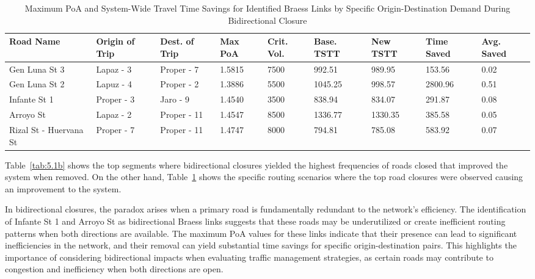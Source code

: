 {
\footnotesize 
\setlength{\tabcolsep}{1.5pt}  
\renewcommand{\thetable}{4.2b}
\begin{longtable}{|p{2.5cm}|p{1.5cm}|p{1.6cm}|p{1.2cm}|p{1.4cm}|p{1.4cm}|p{1.4cm}|p{1.3cm}|p{1.3cm}|} 

\hline
\textbf{Road Name} & \textbf{Origin of Trip} & \textbf{Dest. of Trip} & \textbf{Max PoA} & \textbf{Crit. Vol.} & \textbf{Base. TSTT} & \textbf{New TSTT} & \textbf{Time Saved} & \textbf{Avg. Saved} \\ \hline
\endhead



\hline
\endfoot

\hline
\caption{Maximum PoA and System-Wide Travel Time Savings for Identified Braess Links by Specific Origin-Destination Demand During Bidirectional Closure}
\label{tab:5.2b}
\endlastfoot

Gen Luna St 3 & Lapaz - 3 & Proper - 7 & 1.5815 & 7500 & 992.51 & 989.95 & 153.56 & 0.02 \\ \hline
Gen Luna St 2 & Lapuz - 4 & Proper - 2 & 1.3886 & 5500 & 1045.25 & 998.57 & 2800.96 & 0.51 \\ \hline
Infante St 1 & Proper - 3 & Jaro - 9 & 1.4540 & 3500 & 838.94 & 834.07 & 291.87 & 0.08 \\ \hline
Arroyo St & Lapaz - 2 & Proper - 11 & 1.4547 & 8500 & 1336.77 & 1330.35 & 385.58 & 0.05 \\ \hline
Rizal St - Huervana St & Proper - 7 & Proper - 11 & 1.4747 & 8000 & 794.81 & 785.08 & 583.92 & 0.07 \\ \hline

\end{longtable}
}

Table~\ref{tab:5.1b} shows the top segments where bidirectional closures yielded the highest frequencies of roads closed that improved the system when removed. On the other hand, Table~\ref{tab:5.2b} shows the specific routing scenarios where the top road closures were observed causing an improvement to the system.

In bidirectional closures, the paradox arises when a primary road is fundamentally redundant to the network's efficiency. The identification of Infante St 1 and Arroyo St as bidirectional Braess links suggests that these roads may be underutilized or create inefficient routing patterns when both directions are available. The maximum PoA values for these links indicate that their presence can lead to significant inefficiencies in the network, and their removal can yield substantial time savings for specific origin-destination pairs. This highlights the importance of considering bidirectional impacts when evaluating traffic management strategies, as certain roads may contribute to congestion and inefficiency when both directions are open.


